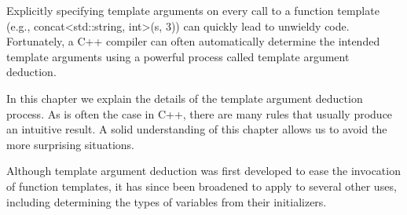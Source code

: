 Explicitly specifying template arguments on every call to a function template (e.g., concat<std::string, int>(s, 3)) can quickly lead to unwieldy code. Fortunately, a C++ compiler can often automatically determine the intended template arguments using a powerful process called template argument deduction.

In this chapter we explain the details of the template argument deduction process. As is often the case in C++, there are many rules that usually produce an intuitive result. A solid understanding of this chapter allows us to avoid the more surprising situations.

Although template argument deduction was first developed to ease the invocation of function templates, it has since been broadened to apply to several other uses, including determining the types of variables from their initializers.